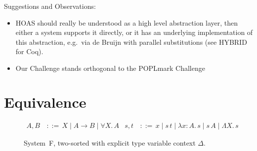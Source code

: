 \documentclass[a4paper,UKenglish]{lipics-v2016}
\makeatletter
\newcommand{\ms}{\,}
\newcommand{\mrel}[1]{\mathrel{\ms #1 \ms}}
\newcommand{\dom}[1]{\ensuremath{\textrm{dom($#1$)}}}
\newcommand{\OF}{\mrel{:}}
\newcommand{\bnfdef}{\mrel{::=}}
\newcommand{\ty}{\mathsf{ty}}
\newcommand{\tm}{\mathsf{tm}}
\newcommand{\of}{\ensuremath{\!:\!}}
\newcommand{\cc}[2]{#1;#2} %
\newcommand{\raisemath}[1]{\mathpalette{\raisem@th{#1}}}
\newcommand{\raisem@th}[3]{\raisebox{#1}{\ensuremath{#2#3}}}
\newcommand{\tsAnnot}[2]{\vdash\hspace{-.7em}^{\raisemath{1.5pt}{\scriptscriptstyle{#2}}}_{\raisemath{0.3pt}{\scriptscriptstyle{#1}}}} %
\newcommand{\tfF}{\tsAnnot{F}{\ty}}  %
\newcommand{\tyF}{\tsAnnot{F}{\tm}}  %
\newcommand{\istyF}[2]{\ensuremath{{#1} \mathrel{\tfF} #2}}
\newcommand{\typingF}[3]{\ensuremath{{#1} \mathrel{\tyF} #2 \OF #3}}
\newcommand{\nAll}[1]{\ensuremath{\forall #1.\,}}
\newcommand{\Lam}[1]{\ensuremath{\lambda #1.\,}}
\newcommand{\nTyLam}[1]{\ensuremath{\Lambda #1.\,}}
\newcommand{\subst}[1]{\hphantom{|}\!\![{#1}]}
\makeatother
\begin{document}
Suggestions and Observations:
\begin{itemize}
\item HOAS should really be understood as a high level abstraction layer, then either a system supports it directly, or it has an underlying implementation of this abstraction, e.g.\ via de Bruijn with parallel substitutions (see HYBRID for Coq).
\item Our Challenge stands orthogonal to the POPLmark Challenge~\cite{poplmark}
\end{itemize}

\section{Equivalence}
\label{sec:equivalence}

\begin{figure}
  \begin{center}
    \begin{align*}
      A, B &\bnfdef X \mid A \to B \mid \nAll X A & s, t &\bnfdef x \mid s\,t \mid \Lam {x \of A} s \mid s\,A \mid \nTyLam X s
    \end{align*}
  \end{center}
  \caption{System~F, two-sorted with explicit type variable context $\Delta$.}
  \label{fig:sys-f}
\end{figure}
\end{document}

